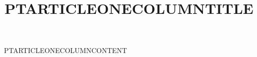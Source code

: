 \documentclass[onecolumn,nominted]{pt-article}
\title{PTARTICLEONECOLUMNTITLE}
\begin{document}
\makeatletter
{}
\makeatother
\noindent PTARTICLEONECOLUMNCONTENT
\end{document}
